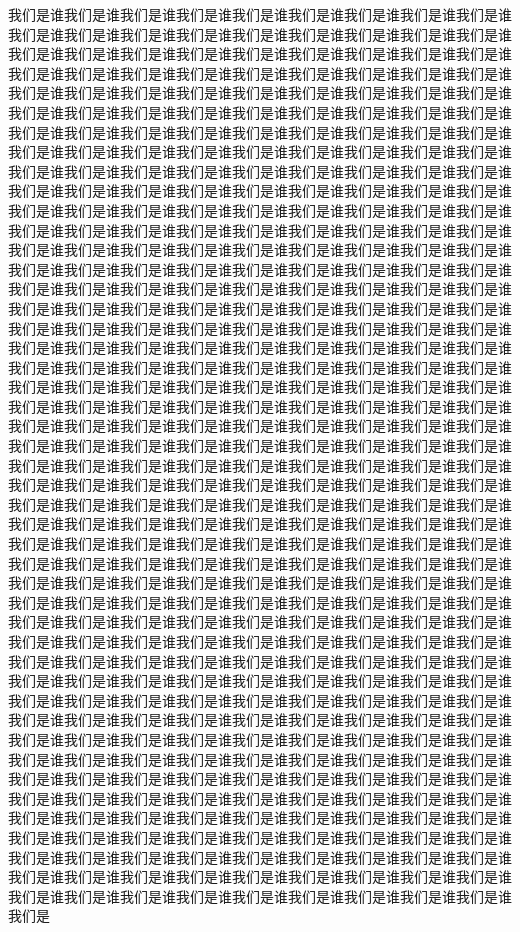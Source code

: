 \documentclass[twocolumn]{cvertbook}
\begin{document}
我们是谁我们是谁我们是谁我们是谁我们是谁我们是谁我们是谁我们是谁我们是谁我们是谁我们是谁我们是谁我们是谁我们是谁我们是谁我们是谁我们是谁我们是谁我们是谁我们是谁我们是谁我们是谁我们是谁我们是谁我们是谁我们是谁我们是谁我们是谁我们是谁我们是谁我们是谁我们是谁我们是谁我们是谁我们是谁我们是谁我们是谁我们是谁我们是谁我们是谁我们是谁我们是谁我们是谁我们是谁我们是谁我们是谁我们是谁我们是谁我们是谁我们是谁我们是谁我们是谁我们是谁我们是谁我们是谁我们是谁我们是谁我们是谁我们是谁我们是谁我们是谁我们是谁我们是谁我们是谁我们是谁我们是谁我们是谁我们是谁我们是谁我们是谁我们是谁我们是谁我们是谁我们是谁我们是谁我们是谁我们是谁我们是谁我们是谁我们是谁我们是谁我们是谁我们是谁我们是谁我们是谁我们是谁我们是谁我们是谁我们是谁我们是谁我们是谁我们是谁我们是谁我们是谁我们是谁我们是谁我们是谁我们是谁我们是谁我们是谁我们是谁我们是谁我们是谁我们是谁我们是谁我们是谁我们是谁我们是谁我们是谁我们是谁我们是谁我们是谁我们是谁我们是谁我们是谁我们是谁我们是谁我们是谁我们是谁我们是谁我们是谁我们是谁我们是谁我们是谁我们是谁我们是谁我们是谁我们是谁我们是谁我们是谁我们是谁我们是谁我们是谁我们是谁我们是谁我们是谁我们是谁我们是谁我们是谁我们是谁我们是谁我们是谁我们是谁我们是谁我们是谁我们是谁我们是谁我们是谁我们是谁我们是谁我们是谁我们是谁我们是谁我们是谁我们是谁我们是谁我们是谁我们是谁我们是谁我们是谁我们是谁我们是谁我们是谁我们是谁我们是谁我们是谁我们是谁我们是谁我们是谁我们是谁我们是谁我们是谁我们是谁我们是谁我们是谁我们是谁我们是谁我们是谁我们是谁我们是谁我们是谁我们是谁我们是谁我们是谁我们是谁我们是谁我们是谁我们是谁我们是谁我们是谁我们是谁我们是谁我们是谁我们是谁我们是谁我们是谁我们是谁我们是谁我们是谁我们是谁我们是谁我们是谁我们是谁我们是谁我们是谁我们是谁我们是谁我们是谁我们是谁我们是谁我们是谁我们是谁我们是谁我们是谁我们是谁我们是谁我们是谁我们是谁我们是谁我们是谁我们是谁我们是谁我们是谁我们是谁我们是谁我们是谁我们是谁我们是谁我们是谁我们是谁我们是谁我们是谁我们是谁我们是谁我们是谁我们是谁我们是谁我们是谁我们是谁我们是谁我们是谁我们是谁我们是谁我们是谁我们是谁我们是谁我们是谁我们是谁我们是谁我们是谁我们是谁我们是谁我们是谁我们是谁我们是谁我们是谁我们是谁我们是谁我们是谁我们是谁我们是谁我们是谁我们是谁我们是谁我们是谁我们是谁我们是谁我们是谁我们是谁我们是谁我们是谁我们是谁我们是谁我们是谁我们是谁我们是谁我们是谁我们是谁我们是谁我们是谁我们是谁我们是谁我们是谁我们是谁我们是谁我们是谁我们是谁我们是谁我们是谁我们是谁我们是谁我们是谁我们是谁我们是谁我们是谁我们是谁我们是谁我们是谁我们是谁我们是谁我们是谁我们是谁我们是谁我们是谁我们是谁我们是谁我们是谁我们是谁我们是谁我们是谁我们是谁我们是谁我们是谁我们是谁我们是谁我们是谁我们是谁我们是谁我们是谁我们是谁我们是谁我们是谁我们是谁我们是谁我们是谁我们是谁我们是谁我们是谁我们是谁我们是谁我们是谁我们是谁我们是谁我们是谁我们是谁我们是谁我们是谁我们是谁我们是谁我们是谁我们是谁我们是谁我们是谁我们是谁我们是谁我们是谁我们是谁我们是谁我们是谁我们是谁我们是谁我们是谁我们是谁我们是谁我们是谁我们是谁我们是谁我们是谁我们是谁我们是谁我们是谁我们是谁我们是谁我们是谁我们是谁我们是谁我们是谁我们是谁我们是谁我们是谁我们是谁我们是谁我们是谁我们是谁我们是谁我们是谁我们是谁我们是谁我们是谁我们是谁我们是谁我们是谁我们是谁我们是谁我们是谁我们是谁我们是谁我们是谁我们是谁我们是谁我们是谁我们是谁我们是谁我们是谁我们是谁我们是谁我们是谁我们是谁我们是谁我们是谁我们是谁我们是谁我们是谁我们是谁我们是谁我们是谁我们是谁我们是谁我们是谁我们是谁我们是谁我们是谁我们是谁我们是谁我们是
\end{document}
